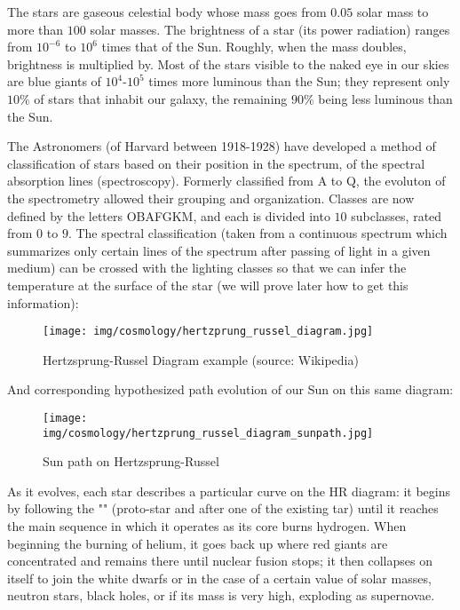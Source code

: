 	The stars are gaseous celestial body whose mass goes from $0.05$ solar mass to more than $100$ solar masses. The brightness of a star (its power radiation) ranges from $10^{-6}$ to $10^6$ times that of the Sun. Roughly, when the mass doubles, brightness is multiplied by. Most of the stars visible to the naked eye in our skies are blue giants of $10^4$-$10^5$ times more luminous than the Sun; they represent only $10\%$ of stars that inhabit our galaxy, the remaining $90\%$ being less luminous than the Sun.
	
	The Astronomers (of Harvard between 1918-1928) have developed a method of classification of stars based on their position in the spectrum, of the spectral absorption lines (spectroscopy). Formerly classified from A to Q, the evoluton of the spectrometry allowed their grouping and organization. Classes are now defined by the letters OBAFGKM, and each is divided into $10$ subclasses, rated from $0$ to $9$. The spectral classification (taken from a continuous spectrum which summarizes only certain lines of the spectrum after passing of light in a given medium) can be crossed with the lighting classes so that we can infer the temperature at the surface of the star (we will prove later how to get this information):
	
	\begin{figure}[H]
		\begin{center}
		\texttt{[image: img/cosmology/hertzprung\_russel\_diagram.jpg]}
		\end{center}	
		\caption{Hertzsprung-Russel Diagram example (source: Wikipedia)}
	\end{figure}
	And corresponding hypothesized path evolution of our Sun on this same diagram:
	\begin{figure}[H]
		\begin{center}
		\texttt{[image: img/cosmology/hertzprung\_russel\_diagram\_sunpath.jpg]}
		\end{center}	
		\caption{Sun path on Hertzsprung-Russel}
	\end{figure}
	As it evolves, each star describes a particular curve on the HR diagram: it begins by following the "" (proto-star and after one of the existing tar) until it reaches the main sequence in which it operates as its core burns hydrogen. When beginning the burning of helium, it goes back up where red giants are concentrated and remains there until nuclear fusion stops; it then collapses on itself to join the white dwarfs or in the case of a certain value of solar masses, neutron stars, black holes, or if its mass is very high, exploding as supernovae.
	
